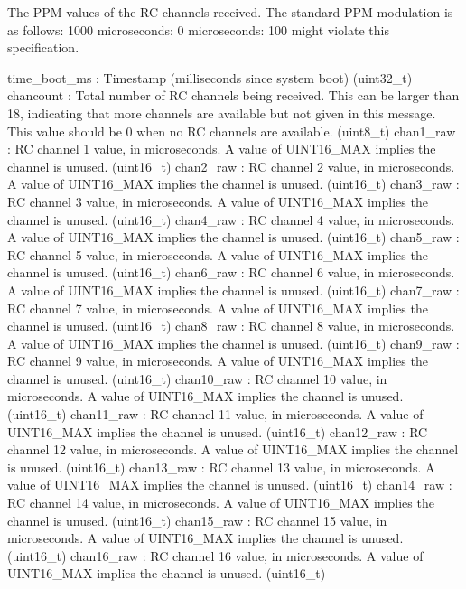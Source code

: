 \begin{DoxyVerb}
\begin{DoxyVerb}
\begin{DoxyVerb}
\begin{DoxyVerb}
\begin{DoxyVerb}The PPM values of the RC channels received. The standard PPM
modulation is as follows: 1000 microseconds: 0%
microseconds: 100%
might violate this specification.

time_boot_ms              : Timestamp (milliseconds since system boot) (uint32_t)
chancount                 : Total number of RC channels being received. This can be larger than 18, indicating that more channels are available but not given in this message. This value should be 0 when no RC channels are available. (uint8_t)
chan1_raw                 : RC channel 1 value, in microseconds. A value of UINT16_MAX implies the channel is unused. (uint16_t)
chan2_raw                 : RC channel 2 value, in microseconds. A value of UINT16_MAX implies the channel is unused. (uint16_t)
chan3_raw                 : RC channel 3 value, in microseconds. A value of UINT16_MAX implies the channel is unused. (uint16_t)
chan4_raw                 : RC channel 4 value, in microseconds. A value of UINT16_MAX implies the channel is unused. (uint16_t)
chan5_raw                 : RC channel 5 value, in microseconds. A value of UINT16_MAX implies the channel is unused. (uint16_t)
chan6_raw                 : RC channel 6 value, in microseconds. A value of UINT16_MAX implies the channel is unused. (uint16_t)
chan7_raw                 : RC channel 7 value, in microseconds. A value of UINT16_MAX implies the channel is unused. (uint16_t)
chan8_raw                 : RC channel 8 value, in microseconds. A value of UINT16_MAX implies the channel is unused. (uint16_t)
chan9_raw                 : RC channel 9 value, in microseconds. A value of UINT16_MAX implies the channel is unused. (uint16_t)
chan10_raw                : RC channel 10 value, in microseconds. A value of UINT16_MAX implies the channel is unused. (uint16_t)
chan11_raw                : RC channel 11 value, in microseconds. A value of UINT16_MAX implies the channel is unused. (uint16_t)
chan12_raw                : RC channel 12 value, in microseconds. A value of UINT16_MAX implies the channel is unused. (uint16_t)
chan13_raw                : RC channel 13 value, in microseconds. A value of UINT16_MAX implies the channel is unused. (uint16_t)
chan14_raw                : RC channel 14 value, in microseconds. A value of UINT16_MAX implies the channel is unused. (uint16_t)
chan15_raw                : RC channel 15 value, in microseconds. A value of UINT16_MAX implies the channel is unused. (uint16_t)
chan16_raw                : RC channel 16 value, in microseconds. A value of UINT16_MAX implies the channel is unused. (uint16_t)

\end{DoxyVerb}
\end{DoxyVerb}
\end{DoxyVerb}
\end{DoxyVerb}
\end{DoxyVerb}
